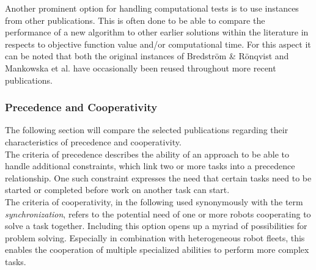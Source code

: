 Another prominent option for handling computational tests is to use instances from other publications. This is often done to be able to compare the performance of a new algorithm to other earlier solutions within the literature in respects to objective function value and/or computational time. For this aspect it can be noted that both the original instances of Bredström \& Rönqvist \cite{bredstromCombinedVehicleRouting2008a} and Mankowska et al. \cite{mankowskaHomeHealthCare2014} have occasionally been reused throughout more recent publications.

\subsubsection{Precedence and Cooperativity}

The following section will compare the selected publications regarding their characteristics of precedence and cooperativity.\\
The criteria of precedence describes the ability of an approach to be able to handle additional constraints, which link two or more tasks into a precedence relationship. One such constraint expresses the need that certain tasks need to be started or completed before work on another task can start.\\\cite{korsah_comprehensive_2013}
The criteria of cooperativity, in the following used synonymously with the term \textit{synchronization}, refers to the potential need of one or more robots cooperating to solve a task together. Including this option opens up a myriad of possibilities for problem solving. Especially in combination with heterogeneous robot fleets, this enables the cooperation of multiple specialized abilities to perform more complex tasks.\\
%

%



